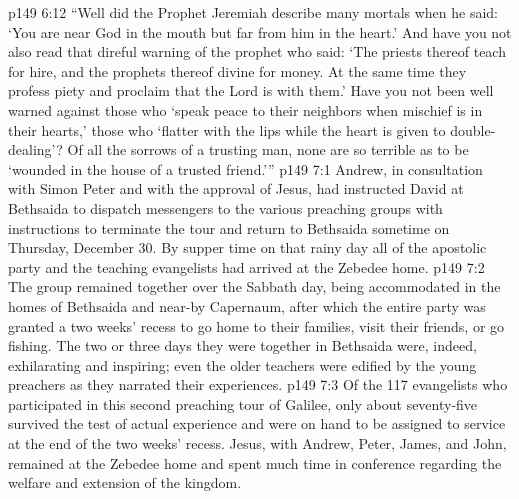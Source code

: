 \vs p149 6:12 \textcolor{ubdarkred}{“Well did the Prophet Jeremiah describe many mortals when he said: ‘You are near God in the mouth but far from him in the heart.’ And have you not also read that direful warning of the prophet who said: ‘The priests thereof teach for hire, and the prophets thereof divine for money. At the same time they profess piety and proclaim that the Lord is with them.’ Have you not been well warned against those who ‘speak peace to their neighbors when mischief is in their hearts,’ those who ‘flatter with the lips while the heart is given to double\hyp{}dealing’? Of all the sorrows of a trusting man, none are so terrible as to be ‘wounded in the house of a trusted friend.’”}
\vs p149 7:1 Andrew, in consultation with Simon Peter and with the approval of Jesus, had instructed David at Bethsaida to dispatch messengers to the various preaching groups with instructions to terminate the tour and return to Bethsaida sometime on Thursday, December 30. By supper time on that rainy day all of the apostolic party and the teaching evangelists had arrived at the Zebedee home.
\vs p149 7:2 The group remained together over the Sabbath day, being accommodated in the homes of Bethsaida and near\hyp{}by Capernaum, after which the entire party was granted a two weeks’ recess to go home to their families, visit their friends, or go fishing. The two or three days they were together in Bethsaida were, indeed, exhilarating and inspiring; even the older teachers were edified by the young preachers as they narrated their experiences.
\vs p149 7:3 Of the 117 evangelists who participated in this second preaching tour of Galilee, only about seventy\hyp{}five survived the test of actual experience and were on hand to be assigned to service at the end of the two weeks’ recess. Jesus, with Andrew, Peter, James, and John, remained at the Zebedee home and spent much time in conference regarding the welfare and extension of the kingdom.
